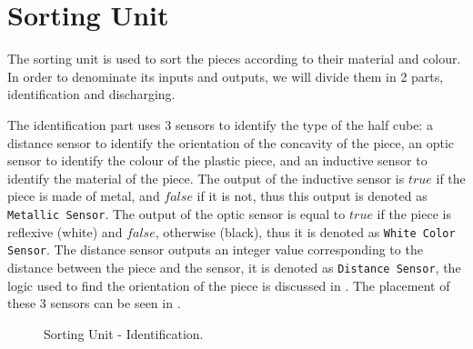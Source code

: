 \section{Sorting Unit}
\label{sec:sortingUnit}
The sorting unit is used to sort the pieces according to their material and colour.
In order to denominate its inputs and outputs, we will divide them in 2 parts,
identification and discharging.

The identification part uses 3 sensors to identify the type of the half cube: a
distance sensor to identify the orientation of the concavity of the piece, an
optic sensor to identify the colour of the plastic piece, and an inductive sensor
to identify the material of the piece. The output of the inductive sensor is
$true$ if the piece is made of metal, and $false$ if it is not, thus this output
is denoted as \verb|Metallic Sensor|. The output of the optic sensor is
equal to $true$ if the piece is reflexive (white) and $false$, otherwise
(black), thus it is denoted as \verb|White Color Sensor|. The distance sensor outputs
an integer value corresponding to the distance between the piece and the sensor, it is
denoted as \verb|Distance Sensor|, the logic used to find the orientation of the
piece is discussed in .
The placement of these 3 sensors can be seen in . 
\begin{figure}[H]
  \centering
  \caption{Sorting Unit - Identification.}
  \label{fig:sortIden}
\end{figure}

